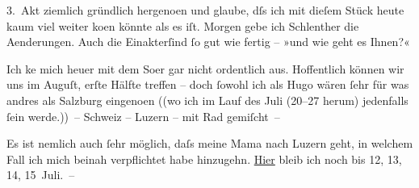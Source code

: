                3. Akt ziemlich gründlich hergeno{\geminationm}en und glaube, dſs ich
               mit dieſem Stück heute kaum viel weiter ko{\geminationm}en könnte als
               es iſt. Morgen gebe ich Schlenther die
               Aenderungen. Auch die Einakterſind{ }ſo gut wie fertig – »und wie geht es
               Ihnen?«\pend
           
\pstart
           Ich ke{\geminationn} mich heuer mit dem So{\geminationm}er gar nicht ordentlich aus. Hoffentlich können wir uns
               im Auguſt, erſte Hälfte treffen – doch{ }ſowohl \introOben{}ich\introOben{} als Hugo wären{ }ſehr für was {\pb}andres als Salzburg
                  eingeno{\geminationm}en \introOben{}(\introOben{}(wo ich im Lauf
               des Juli (20–27 herum) jedenfalls{ }ſein
               werde.)) – Schweiz – Luzern – mit Rad gemiſcht –\pend
           
\pstart
           Es ist nemlich auch{ }ſehr möglich, daſs meine Mama nach Luzern geht,
               in welchem Fall ich mich beinah verpflichtet habe hinzugehn. \uline{Hier} bleib ich noch bis 12, 13, 14, 15 Juli. –\pend
           
